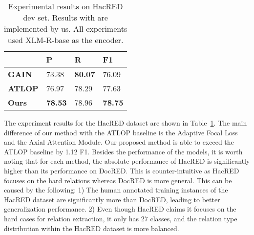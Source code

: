 \documentclass[11pt]{article}
\begin{document}
\begin{table}[ht]
\centering

\begin{tabular}{llll} 
\hline
~     & P     & R     & F1     \\ 
\hline
\textbf{GAIN}   & 73.38 & \textbf{80.07} & 76.09  \\
\textbf{ATLOP} & 76.97 & 78.29 & 77.63  \\
\textbf{Ours}  & \textbf{78.53} & 78.96 & \textbf{78.75}  \\
\hline
\end{tabular}
\setlength{\abovecaptionskip}{2pt}
\caption{Experimental results on HacRED dev set. Results with  are implemented by us. All experiments used XLM-R-base as the encoder.}
\label{tab:hacred}
\end{table}

The experiment results for the HacRED dataset are shown in Table~\ref{tab:hacred}. The main difference of our method with the ATLOP baseline is the Adaptive Focal Loss and the Axial Attention Module. Our proposed method is able to exceed the ATLOP baseline by 1.12 F1. Besides the performance of the models, it is worth noting that for each method, the absolute performance of HacRED is significantly higher than its performance on DocRED. This is counter-intuitive as HacRED focuses on the hard relations whereas DocRED is more general. This can be caused by the following: 1) The human annotated training instances of the HacRED dataset are significantly more than DocRED, leading to better generalization performance. 2) Even though HacRED claims it focuses on the hard cases for relation extraction, it only has 27 classes, and the relation type distribution within the HacRED dataset is more balanced. 
\end{document}
